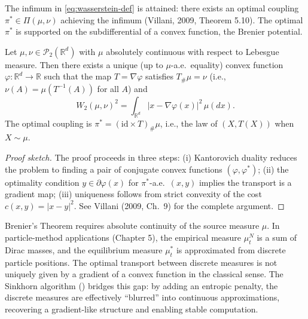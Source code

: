 The infimum in \eqref{eq:wasserstein-def} is attained: there exists an optimal coupling
$\pi^* \in \Pi(\mu,\nu)$ achieving the infimum (Villani, 2009, Theorem 5.10). The
optimal $\pi^*$ is supported on the subdifferential of a convex function, the Brenier
potential.

\begin{theorem}
\label{thm:brenier}
Let $\mu, \nu \in \mathcal{P}_2(\mathbb{R}^d)$ with $\mu$ absolutely continuous with
respect to Lebesgue measure. Then there exists a unique (up to $\mu$-a.e.\ equality)
convex function $\varphi : \mathbb{R}^d \to \mathbb{R}$ such that the map
$T = \nabla \varphi$ satisfies $T_\# \mu = \nu$ (i.e., $\nu(A) = \mu(T^{-1}(A))$ for all
$A$) and
\[
    W_2(\mu,\nu)^2 = \int_{\mathbb{R}^d} |x - \nabla\varphi(x)|^2\, \mu(dx).
\]
The optimal coupling is $\pi^* = (\mathrm{id} \times T)_\# \mu$, i.e., the law of
$(X, T(X))$ when $X \sim \mu$.
\end{theorem}

\begin{proof}[Proof sketch]
The proof proceeds in three steps: (i) Kantorovich duality reduces the problem to
finding a pair of conjugate convex functions $(\varphi, \varphi^*)$; (ii) the
optimality condition $y \in \partial\varphi(x)$ for $\pi^*$-a.e.\ $(x,y)$ implies the
transport is a gradient map; (iii) uniqueness follows from strict convexity of the cost
$c(x,y) = |x-y|^2$. See Villani (2009, Ch.\ 9) for the complete argument.
\end{proof}

\begin{remark}
Brenier's Theorem requires absolute continuity of the source measure $\mu$. In
particle-method applications (Chapter 5), the empirical measure $\mu_t^N$ is a sum of
Dirac masses, and the equilibrium measure $\mu_t^*$ is approximated from discrete
particle positions.
The optimal transport between discrete measures is not uniquely given by a gradient of
a convex function in the classical sense. The Sinkhorn algorithm
() bridges this gap: by adding an entropic penalty, the discrete
measures are effectively ``blurred'' into continuous approximations, recovering a
gradient-like structure and enabling stable computation.
\end{remark}

